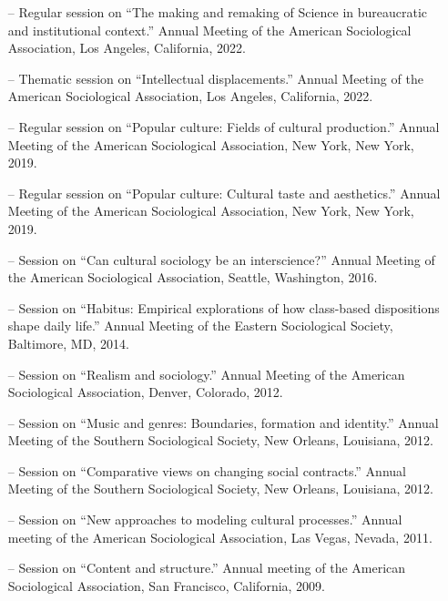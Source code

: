 \begin{itemize}[itemsep=-0.5ex]
   \item[--] Regular session on ``The making and remaking of Science in bureaucratic and institutional context.'' Annual Meeting of the American Sociological Association, Los Angeles, California, 2022.
    
    \item[--] Thematic session on ``Intellectual displacements.'' Annual Meeting of the American Sociological Association, Los Angeles, California, 2022.
    
    \item[--] Regular session on ``Popular culture: Fields of cultural production.'' Annual Meeting of the American Sociological Association, New York, New York, 2019.
    
    \item[--] Regular session on ``Popular culture: Cultural taste and aesthetics.'' Annual Meeting of the American Sociological Association, New York, New York, 2019.
    
    \item[--] Session on  ``Can cultural sociology be an interscience?'' Annual Meeting of the American Sociological Association, Seattle, Washington, 2016.
    
    \item[--] Session on ``Habitus: Empirical explorations of how class-based dispositions shape daily life.'' Annual Meeting of the Eastern Sociological Society, Baltimore, MD, 2014.
    
    \item[--] Session on ``Realism and sociology.'' Annual Meeting of the American Sociological Association, Denver, Colorado, 2012.
    
    \item[--] Session on ``Music and genres: Boundaries, formation and identity.'' Annual Meeting of the Southern Sociological Society, New Orleans, Louisiana, 2012.
    
    \item[--] Session on ``Comparative views on changing social contracts.'' Annual Meeting of the Southern Sociological Society, New Orleans, Louisiana, 2012.
    
    \item[--] Session on ``New approaches to modeling cultural processes.'' Annual meeting of the American Sociological Association, Las Vegas, Nevada, 2011.
    
    \item[--] Session on ``Content and structure.'' Annual meeting of the American Sociological Association, San Francisco, California, 2009.
    

\end{itemize}

